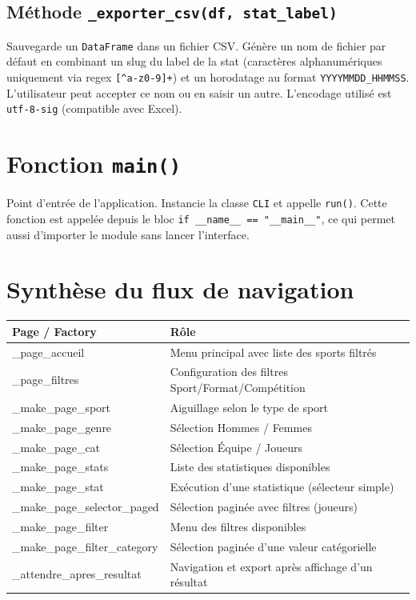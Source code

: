 \documentclass[12pt,a4paper]{article}
\begin{document}
\subsection{Méthode \texttt{\_exporter\_csv(df, stat\_label)}}
Sauvegarde un \texttt{DataFrame} dans un fichier CSV. Génère un nom
de fichier par défaut en combinant un slug du label de la stat
(caractères alphanumériques uniquement via regex
\texttt{[{\textasciicircum}a-z0-9]+}) et un horodatage au format
\texttt{YYYYMMDD\_HHMMSS}. L'utilisateur peut accepter ce nom ou en
saisir un autre. L'encodage utilisé est \texttt{utf-8-sig} (compatible
avec Excel).

\section{Fonction \texttt{main()}}

Point d'entrée de l'application. Instancie la classe \texttt{CLI} et
appelle \texttt{run()}. Cette fonction est appelée depuis le bloc
\texttt{if \_\_name\_\_ == "\_\_main\_\_"}, ce qui permet aussi
d'importer le module sans lancer l'interface.

\section{Synthèse du flux de navigation}

\begin{center}
\begin{tabular}{>{\ttfamily}p{4.5cm} p{9cm}}
\toprule
\textbf{Page / Factory} & \textbf{Rôle} \\
\midrule
\_page\_accueil & Menu principal avec liste des sports filtrés \\
\_page\_filtres & Configuration des filtres Sport/Format/Compétition \\
\_make\_page\_sport & Aiguillage selon le type de sport \\
\_make\_page\_genre & Sélection Hommes / Femmes \\
\_make\_page\_cat & Sélection Équipe / Joueurs \\
\_make\_page\_stats & Liste des statistiques disponibles \\
\_make\_page\_stat & Exécution d'une statistique (sélecteur simple) \\
\_make\_page\_selector\_paged & Sélection paginée avec filtres (joueurs) \\
\_make\_page\_filter & Menu des filtres disponibles \\
\_make\_page\_filter\_category & Sélection paginée d'une valeur catégorielle \\
\_attendre\_apres\_resultat & Navigation et export après affichage d'un résultat \\
\bottomrule
\end{tabular}
\end{center}
\end{document}
